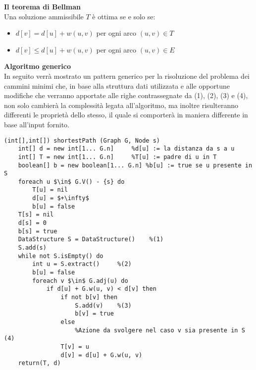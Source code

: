 \documentclass[../cheatSheetAlgoritmi.tex]{subfiles}
\begin{document}
\bigskip
\textbf{Il teorema di Bellman} \\
Una soluzione ammissibile $T$ è ottima se e solo se:
\begin{itemize}
	\item $d[v] = d[u] +w(u, v)$ per ogni arco $(u, v) \in T$
	\item $d[v] \leq d[u] +w(u, v)$ per ogni arco $(u, v) \in E$
\end{itemize}
\textbf{Algoritmo generico} \\
In seguito verrà mostrato un pattern generico per la risoluzione del problema dei cammini minimi che, in base alla struttura dati utilizzata e alle opportune modifiche che verranno apportate alle righe contrassegnate da (1), (2), (3) e (4), non solo cambierà la complessità legata all'algoritmo, ma inoltre risulteranno differenti le proprietà dello stesso, il quale si comporterà in maniera differente in base all'input fornito.
\begin{lstlisting}[caption=Algoritmo generico per il problema dei cammini minimi a sorgente singola]
(int[],int[]) shortestPath (Graph G, Node s)
	int[] d = new int[1... G.n]		%d[u] := la distanza da s a u 
	int[] T = new int[1... G.n]		%T[u] := padre di u in T
	boolean[] b = new boolean[1... G.n]	%b[u] := true se u presente in S 
	foreach u $\in$ G.V() - {s} do
		T[u] = nil
		d[u] = $+\infty$
		b[u] = false
	T[s] = nil
	d[s] = 0
	b[s] = true
	DataStructure S = DataStructure()	 %(1)
	S.add(s)
	while not S.isEmpty() do 
		int u = S.extract() 	%(2)
		b[u] = false
		foreach v $\in$ G.adj(u) do
			if d[u] + G.w(u, v) < d[v] then 
				if not b[v] then
					S.add(v)	%(3)
					b[v] = true
				else
					%Azione da svolgere nel caso v sia presente in S (4)
				T[v] = u 
				d[v] = d[u] + G.w(u, v)
	return(T, d)
\end{lstlisting}
\newpage
\end{document}
